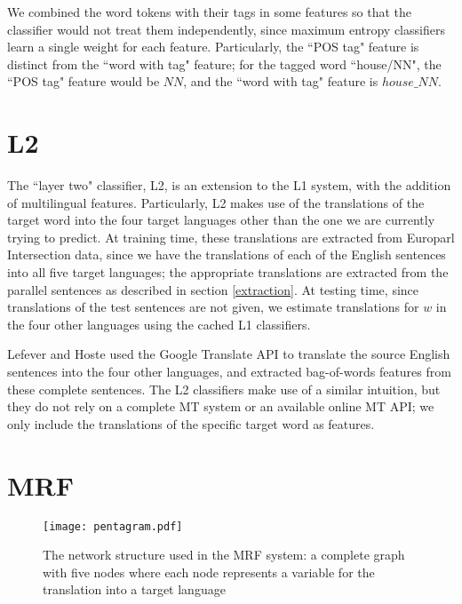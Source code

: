\documentclass[11pt,letterpaper]{article}
\begin{document}
We combined the word tokens with their tags in some features so that the
classifier would not treat them independently, since maximum entropy
classifiers learn a single weight for each feature.
Particularly, the ``POS tag" feature is distinct from the ``word with tag"
feature; for the tagged word ``house/NN", the ``POS tag" feature would be $NN$,
and the ``word with tag" feature is $house\_NN$. 

\section{L2}
The ``layer two" classifier, L2, is an extension to the L1 system, with the
addition of multilingual features. Particularly, L2 makes use of the
translations of the target word into the four target languages other than the
one we are currently trying to predict. At training time, these translations
are extracted from Europarl Intersection data, since we have the
translations of each of the English sentences into all five target
languages; the appropriate translations are extracted from the parallel
sentences as described in section \ref{extraction}. At testing time, since
translations of the test sentences are not given, we estimate translations for
$w$ in the four other languages using the cached L1 classifiers.

Lefever and Hoste  used the
Google Translate API to translate the source English sentences into the four
other languages, and extracted
bag-of-words features from these complete sentences. The L2 classifiers make
use of a similar intuition, but they do not rely on a complete MT system or an
available online MT API; we only include the translations of the specific
target word as features.

\section{MRF}
\begin{figure}
  \begin{center}
  \texttt{[image: pentagram.pdf]}
  \end{center}
  \caption{The network structure used in the MRF system: a complete graph with
    five nodes where each node represents a variable for the translation into a
    target language}
  \label{fig:pentagram}
\end{figure}
\end{document}
